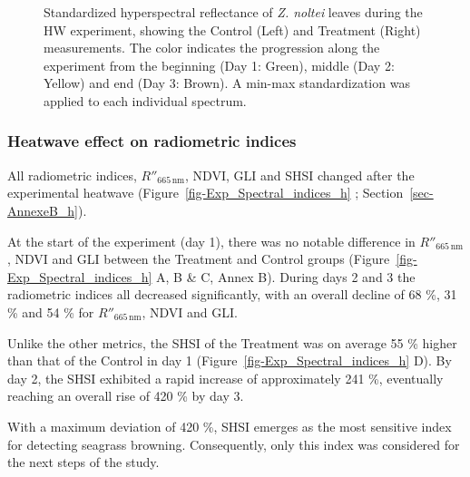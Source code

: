 \documentclass[
  letterpaper,
  11pt,
  english,
  singlespacing,
  headsepline]{MastersDoctoralThesis}
\begin{document}
\begin{spacing}{1.5}
\begin{figure}
{}

\caption{\label{fig-Exp_Spectra_h}Standardized hyperspectral reflectance
of \emph{Z. noltei} leaves during the HW experiment, showing the Control
(Left) and Treatment (Right) measurements. The color indicates the
progression along the experiment from the beginning (Day 1: Green),
middle (Day 2: Yellow) and end (Day 3: Brown). A min-max standardization
was applied to each individual spectrum.}

\end{figure}%

\subsubsection{Heatwave effect on radiometric
indices}\label{heatwave-effect-on-radiometric-indices}

All radiometric indices, \(R''_{665 \, \text{nm}}\), NDVI, GLI and SHSI
changed after the experimental heatwave
(Figure~\ref{fig-Exp_Spectral_indices_h} ; Section~\ref{sec-AnnexeB_h}).

At the start of the experiment (day 1), there was no notable difference
in \(R''_{665 \, \text{nm}}\), NDVI and GLI between the Treatment and
Control groups (Figure~\ref{fig-Exp_Spectral_indices_h} A, B \& C, Annex
B). During days 2 and 3 the radiometric indices all decreased
significantly, with an overall decline of 68 \%, 31 \% and 54 \% for
\(R''_{665 \, \text{nm}}\), NDVI and GLI.

Unlike the other metrics, the SHSI of the Treatment was on average 55 \%
higher than that of the Control in day 1
(Figure~\ref{fig-Exp_Spectral_indices_h} D). By day 2, the SHSI
exhibited a rapid increase of approximately 241 \%, eventually reaching
an overall rise of 420 \% by day 3.

With a maximum deviation of 420 \%, SHSI emerges as the most sensitive
index for detecting seagrass browning. Consequently, only this index was
considered for the next steps of the study.

\begin{figure}

\centering{

}
\end{figure}
\end{spacing}
\end{document}
